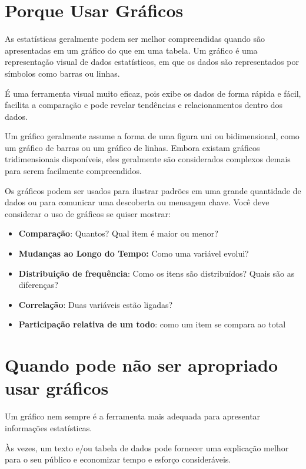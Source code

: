 \section{Porque Usar Gráficos}

As estatísticas geralmente podem ser melhor compreendidas quando são apresentadas em um gráfico do que em uma tabela. Um gráfico é uma representação visual de dados estatísticos, em que os dados são representados por símbolos como barras ou linhas.
\vskip0.3cm  

É uma ferramenta visual muito eficaz, pois exibe os dados de forma rápida e fácil, facilita a comparação e pode revelar tendências e relacionamentos dentro dos dados.\vskip0.3cm  

Um gráfico geralmente assume a forma de uma figura uni ou bidimensional, como um gráfico de barras ou um gráfico de linhas. Embora existam gráficos tridimensionais disponíveis, eles geralmente são considerados complexos demais para serem facilmente compreendidos.\vskip0.3cm  

Os gráficos podem ser usados para ilustrar padrões em uma grande quantidade de dados ou para comunicar uma descoberta ou mensagem chave. Você deve considerar o uso de gráficos se quiser mostrar:

\begin{itemize}
    \item \textbf{Comparação}: Quantos? Qual item é maior ou menor?
    \item \textbf{Mudanças ao Longo do Tempo:} Como uma variável evolui?
    \item \textbf{Distribuição de frequência}: Como os itens são distribuídos? Quais são as diferenças?
    \item \textbf{Correlação}: Duas variáveis estão ligadas?
    \item \textbf{Participação relativa de um todo}: como um item se compara ao total
\end{itemize}


\section{Quando pode não ser apropriado usar gráficos}

Um gráfico nem sempre é a ferramenta mais adequada para apresentar informações estatísticas. \vskip0.3cm

Às vezes, um texto e/ou tabela de dados pode fornecer uma explicação melhor para o seu público e economizar tempo e esforço consideráveis.\vskip0.3cm

